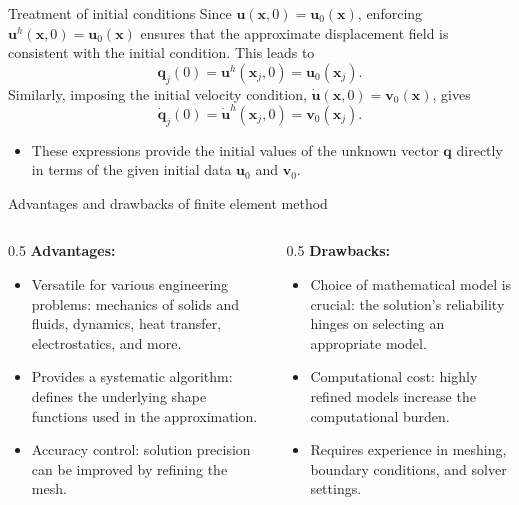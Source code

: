 \documentclass[aspectratio=169]{beamer}
\begin{document}
\begin{frame}{Treatment of initial conditions}
  Since \( \mathbf{u}(\mathbf{x},0) = \mathbf{u}_0(\mathbf{x}) \), enforcing \( \mathbf{u}^h(\mathbf{x},0) = \mathbf{u}_0(\mathbf{x}) \) ensures that the approximate displacement field is consistent with the initial condition. This leads to
  \[
    \mathbf{q}_j(0) = \mathbf{u}^h(\mathbf{x}_j,0) = \mathbf{u}_0(\mathbf{x}_j).
  \]
  Similarly, imposing the initial velocity condition, $ \dot{\mathbf{u}}(\mathbf{x},0) = \mathbf{v}_0(\mathbf{x})$, gives
  \[
    \mathbf{\dot{q}}_j(0) = \mathbf{\dot{u}}^h(\mathbf{x}_j,0) = \mathbf{v}_0(\mathbf{x}_j).
  \]
  \vspace{-0.5cm}
  \begin{itemize}
    \item[\Checkmark]
          These expressions provide the initial values of the unknown vector \( \mathbf{q} \) directly in terms of the given initial data \( \mathbf{u}_0 \) and \( \mathbf{v}_0 \).
  \end{itemize}
\end{frame}


\begin{frame}{Advantages and drawbacks of finite element method}
  \begin{columns}
    \begin{column}{0.5\textwidth}
      \textbf{Advantages:}
      \begin{itemize}
        \item[\Checkmark] Versatile for various engineering problems: mechanics of solids and fluids, dynamics, heat transfer, electrostatics, and more.
        \item[\Checkmark] Provides a systematic algorithm: defines the underlying shape functions used in the approximation.
        \item[\Checkmark]  Accuracy control: solution precision can be improved by refining the mesh.
      \end{itemize}
    \end{column}

    \begin{column}{0.5\textwidth}
      \textbf{Drawbacks:}
      \begin{itemize}
        \item[\XSolidBrush]Choice of mathematical model is crucial: the solution's reliability hinges on selecting an appropriate model.
        \item[\XSolidBrush]Computational cost: highly refined models increase the computational burden.
        \item[\XSolidBrush]Requires experience in meshing, boundary conditions, and solver settings.
      \end{itemize}
    \end{column}
  \end{columns}
\end{frame}
\end{document}
